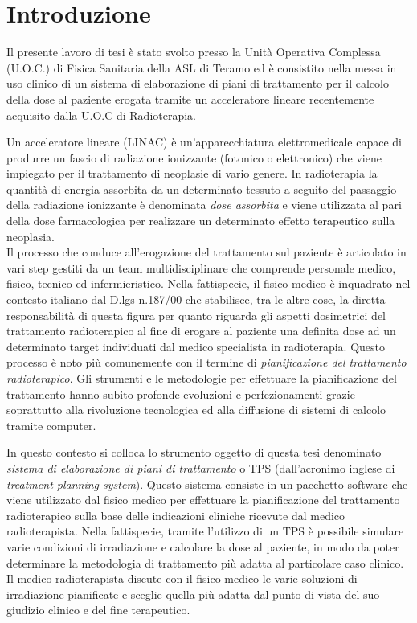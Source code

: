 \chapter*{Introduzione} 
Il presente lavoro di tesi è stato svolto presso la Unità Operativa Complessa (U.O.C.) di Fisica Sanitaria della ASL di Teramo ed è consistito nella messa in uso clinico di un sistema di elaborazione di piani di trattamento per il calcolo della dose al paziente erogata tramite un acceleratore lineare recentemente acquisito dalla U.O.C di Radioterapia. 

Un acceleratore lineare (LINAC) è un'apparecchiatura elettromedicale capace di produrre un fascio di radiazione ionizzante (fotonico o elettronico) che viene impiegato per il trattamento di neoplasie di vario genere. In radioterapia la quantità di energia assorbita da un determinato tessuto a seguito del passaggio della radiazione ionizzante è denominata \textit{dose assorbita} e viene utilizzata al pari della dose farmacologica per realizzare un determinato effetto terapeutico sulla neoplasia.\\
Il processo che conduce all'erogazione del trattamento sul paziente è articolato in vari step gestiti da un team multidisciplinare che comprende personale medico, fisico, tecnico ed infermieristico. Nella fattispecie, il fisico medico è inquadrato nel contesto italiano dal D.lgs n.187/00 che stabilisce, tra le altre cose, la diretta responsabilità di questa figura per quanto riguarda gli aspetti dosimetrici del trattamento radioterapico al fine di erogare al paziente una definita dose ad un determinato target individuati dal medico specialista in radioterapia. Questo processo è noto più comunemente con il termine di \textit{pianificazione del trattamento radioterapico}. Gli strumenti e le metodologie per effettuare la pianificazione del trattamento hanno subito profonde evoluzioni e perfezionamenti grazie soprattutto alla rivoluzione tecnologica ed alla diffusione di sistemi di calcolo tramite computer. 

In questo contesto si colloca lo strumento oggetto di questa tesi denominato \textit{sistema di elaborazione di piani di trattamento} o TPS (dall'acronimo inglese di \textit{treatment planning system}). Questo sistema consiste in un pacchetto software che viene utilizzato dal fisico medico per effettuare la pianificazione del trattamento radioterapico sulla base delle indicazioni cliniche ricevute dal medico radioterapista. Nella fattispecie, tramite l'utilizzo di un TPS è possibile simulare varie condizioni di irradiazione e calcolare la dose al paziente, in modo da poter determinare la metodologia di trattamento più adatta al particolare caso clinico. Il medico radioterapista discute con il fisico medico le varie soluzioni di irradiazione pianificate e sceglie quella più adatta dal punto di vista del suo giudizio clinico e del fine terapeutico.

